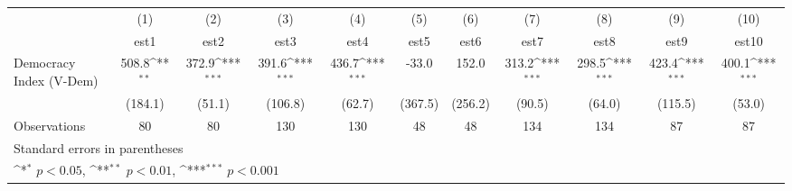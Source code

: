 {
\def\sym#1{\ifmmode^{#1}\else\(^{#1}\)\fi}
\begin{tabular}{l*{10}{c}}
\hline\hline
                    &\multicolumn{1}{c}{(1)}         &\multicolumn{1}{c}{(2)}         &\multicolumn{1}{c}{(3)}         &\multicolumn{1}{c}{(4)}         &\multicolumn{1}{c}{(5)}         &\multicolumn{1}{c}{(6)}         &\multicolumn{1}{c}{(7)}         &\multicolumn{1}{c}{(8)}         &\multicolumn{1}{c}{(9)}         &\multicolumn{1}{c}{(10)}         \\
                    &        est1         &        est2         &        est3         &        est4         &        est5         &        est6         &        est7         &        est8         &        est9         &       est10         \\
\hline
Democracy Index (V-Dem)&       508.8\sym{**} &       372.9\sym{***}&       391.6\sym{***}&       436.7\sym{***}&       -33.0         &       152.0         &       313.2\sym{***}&       298.5\sym{***}&       423.4\sym{***}&       400.1\sym{***}\\
                    &     (184.1)         &      (51.1)         &     (106.8)         &      (62.7)         &     (367.5)         &     (256.2)         &      (90.5)         &      (64.0)         &     (115.5)         &      (53.0)         \\
\hline
Observations        &          80         &          80         &         130         &         130         &          48         &          48         &         134         &         134         &          87         &          87         \\
\hline\hline
\multicolumn{11}{l}{\footnotesize Standard errors in parentheses}\\
\multicolumn{11}{l}{\footnotesize \sym{*} \(p<0.05\), \sym{**} \(p<0.01\), \sym{***} \(p<0.001\)}\\
\end{tabular}
}
